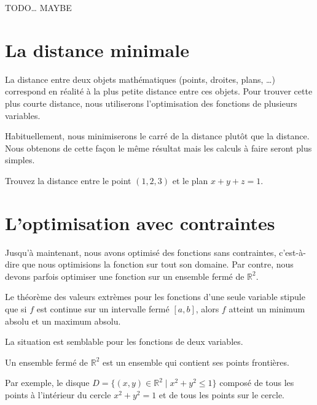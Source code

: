 \documentclass[]{book}
\theoremstyle{definition}
\theoremstyle{definition}
\theoremstyle{definition}
\theoremstyle{remark}
\let\BeginKnitrBlock\begin \let\EndKnitrBlock\end
\begin{document}
TODO\ldots{} MAYBE

\hypertarget{la-distance-minimale}{%
\section{La distance minimale}\label{la-distance-minimale}}

La distance entre deux objets mathématiques (points, droites, plans,
\ldots{}) correspond en réalité à la plus petite distance entre ces
objets. Pour trouver cette plus courte distance, nous utiliserons
l'optimisation des fonctions de plusieurs variables.

\BeginKnitrBlock{remark}
{}Habituellement, nous minimiserons le carré
de la distance plutôt que la distance. Nous obtenons de cette façon le
même résultat mais les calculs à faire seront plus simples.
\EndKnitrBlock{remark}

\BeginKnitrBlock{example}
\protect\hypertarget{exm:unnamed-chunk-223}{}{\label{exm:unnamed-chunk-223}
}Trouvez la distance entre le point \((1,2,3)\) et le plan \(x+y+z=1\).
\EndKnitrBlock{example}
\vspace*{8cm}

\hypertarget{loptimisation-avec-contraintes}{%
\section{L'optimisation avec
contraintes}\label{loptimisation-avec-contraintes}}

Jusqu'à maintenant, nous avons optimisé des fonctions sans contraintes,
c'est-à-dire que nous optimisions la fonction sur tout son domaine. Par
contre, nous devons parfois optimiser une fonction sur un ensemble fermé
de \(\mathbb{R}^2\).

Le théorème des valeurs extrèmes pour les fonctions d'une seule variable
stipule que si \(f\) est continue sur un intervalle fermé \([a,b]\),
alors \(f\) atteint un minimum absolu et un maximum absolu.

La situation est semblable pour les fonctions de deux variables.

\BeginKnitrBlock{definition}[Ensemble fermé]
\protect\hypertarget{def:unnamed-chunk-224}{}{\label{def:unnamed-chunk-224}
{} }Un ensemble fermé de \(\mathbb{R}^2\)
est un ensemble qui contient ses points frontières.
\EndKnitrBlock{definition}

Par exemple, le disque \(D=\{(x,y)\in\mathbb{R}^2\mid x^2+y^2\leq 1\}\)
composé de tous les points à l'intérieur du cercle \(x^2+y^2=1\) et de
tous les points sur le cercle.
\end{document}

